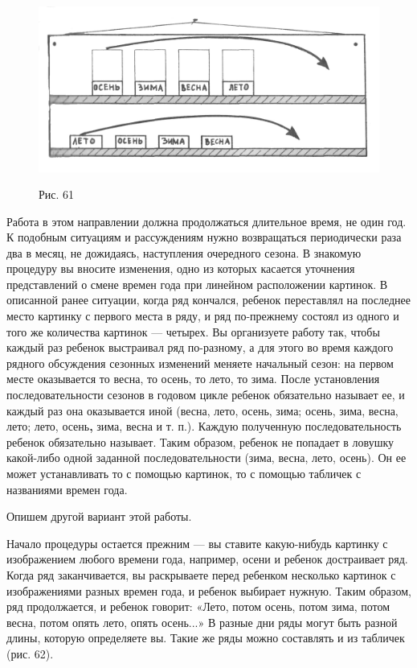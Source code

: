 \documentclass[a5paper]{book}
\begin{document}
\begin{figure}
\centering
\includegraphics[width=4.96667in,height=2.42014in]{media/media/image58.jpg}
\caption*{Рис. 61}
\end{figure}

Работа в этом направлении должна продолжаться длительное время, не один
год. К подобным ситуациям и рассуждениям нужно возвращаться периодически
раза два в месяц, не дожидаясь, наступления очередного сезона. В
знакомую процедуру вы вносите изменения, одно из которых касается
уточнения представлений о смене времен года при линейном расположении
картинок. В описанной ранее ситуации, когда ряд кончался, ребенок
переставлял на последнее место картинку с первого места в ряду, и ряд
по-прежнему состоял из одного и того же количества картинок --- четырех.
Вы организуете работу так, чтобы каждый раз ребенок выстраивал ряд
по-разному, а для этого во время каждого рядного обсуждения сезонных
изменений меняете начальный сезон: на первом месте оказывается то весна,
то осень, то лето, то зима. После установления последовательности
сезонов в годовом цикле ребенок обязательно называет ее, и каждый раз
она оказывается иной (весна, лето, осень, зима; осень, зима, весна,
лето; лето, осень\textbf{,} зима, весна и т. п.). Каждую полученную
последовательность ребенок обязательно называет. Таким образом, ребенок
не попадает в ловушку какой-либо одной заданной последовательности
(зима, весна, лето, осень). Он ее может устанавливать то с помощью
картинок, то с помощью табличек с названиями времен года.

Опишем другой вариант этой работы.

Начало процедуры остается прежним --- вы ставите какую-нибудь картинку с
изображением любого времени года, например, осени и ребенок достраивает
ряд. Когда ряд заканчивается, вы раскрываете перед ребенком несколько
картинок с изображениями разных времен года, и ребенок выбирает нужную.
Таким образом, ряд продолжается, и ребенок говорит: «Лето, потом осень,
потом зима, потом весна, потом опять лето, опять осень...» В разные дни
ряды могут быть разной длины, которую определяете вы. Такие же ряды
можно составлять и из табличек (рис. 62).
\end{document}
